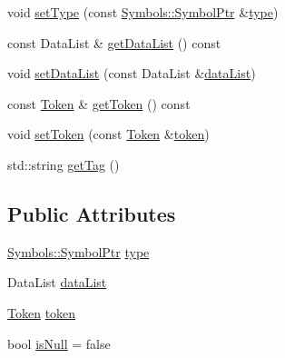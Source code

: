 \begin{DoxyCompactItemize}
void \mbox{\hyperlink{struct_erable_1_1_compiler_1_1_data_1_1_processed_data_a367b0f13c30a4993af807d9047d0e9fd}{set\+Type}} (const \mbox{\hyperlink{namespace_erable_1_1_compiler_1_1_symbols_a8f0bc762f448ea4d84e8713ab3e140b9}{Symbols\+::\+Symbol\+Ptr}} \&\mbox{\hyperlink{struct_erable_1_1_compiler_1_1_data_1_1_processed_data_a891ed9e3f277ec69809cd3153da88a9c}{type}})
\item 
const Data\+List \& \mbox{\hyperlink{struct_erable_1_1_compiler_1_1_data_1_1_processed_data_a1c65a2cde0bd13f80f675cdd0e597925}{get\+Data\+List}} () const
\item 
void \mbox{\hyperlink{struct_erable_1_1_compiler_1_1_data_1_1_processed_data_a5d33e86b05e5ca221cb047d1213266c5}{set\+Data\+List}} (const Data\+List \&\mbox{\hyperlink{struct_erable_1_1_compiler_1_1_data_1_1_processed_data_a3b56a46346d13ce73a9920b66ec79ce6}{data\+List}})
\item 
const \mbox{\hyperlink{struct_token}{Token}} \& \mbox{\hyperlink{struct_erable_1_1_compiler_1_1_data_1_1_processed_data_a514880eacca458af59ac937e2d52e397}{get\+Token}} () const
\item 
void \mbox{\hyperlink{struct_erable_1_1_compiler_1_1_data_1_1_processed_data_aa5fc8b4a47a3e022085cb9c0c902db65}{set\+Token}} (const \mbox{\hyperlink{struct_token}{Token}} \&\mbox{\hyperlink{struct_erable_1_1_compiler_1_1_data_1_1_processed_data_acca79c74d6614ba873b4699b56550fc2}{token}})
\item 
std\+::string \mbox{\hyperlink{struct_erable_1_1_compiler_1_1_data_1_1_processed_data_a8745ba8f571dff08e5979fa7cf191a1c}{get\+Tag}} ()
\end{DoxyCompactItemize}
\subsection*{Public Attributes}
\begin{DoxyCompactItemize}
\item 
\mbox{\hyperlink{namespace_erable_1_1_compiler_1_1_symbols_a8f0bc762f448ea4d84e8713ab3e140b9}{Symbols\+::\+Symbol\+Ptr}} \mbox{\hyperlink{struct_erable_1_1_compiler_1_1_data_1_1_processed_data_a891ed9e3f277ec69809cd3153da88a9c}{type}}
\item 
Data\+List \mbox{\hyperlink{struct_erable_1_1_compiler_1_1_data_1_1_processed_data_a3b56a46346d13ce73a9920b66ec79ce6}{data\+List}}
\item 
\mbox{\hyperlink{struct_token}{Token}} \mbox{\hyperlink{struct_erable_1_1_compiler_1_1_data_1_1_processed_data_acca79c74d6614ba873b4699b56550fc2}{token}}
\item 
bool \mbox{\hyperlink{struct_erable_1_1_compiler_1_1_data_1_1_processed_data_a8b85722907d1221f76b9e0469968ee73}{is\+Null}} = false
\end{DoxyCompactItemize}


